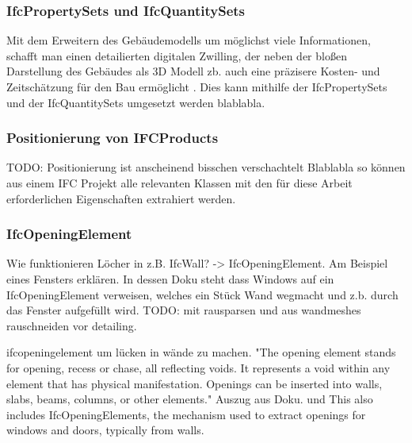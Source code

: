 \subsubsection{IfcPropertySets und IfcQuantitySets}
Mit dem Erweitern des Gebäudemodells um möglichst viele Informationen, schafft man einen detailierten digitalen Zwilling, der neben der bloßen Darstellung des Gebäudes als 3D Modell zb. auch eine präzisere Kosten- und Zeitschätzung für den Bau ermöglicht \cite{Industry93:online}. 
Dies kann mithilfe der IfcPropertySets und der IfcQuantitySets umgesetzt werden blablabla. %

\subsubsection{Positionierung von IFCProducts}
TODO: Positionierung ist anscheinend bisschen verschachtelt
Blablabla so können aus einem IFC Projekt alle relevanten Klassen mit den für diese Arbeit erforderlichen Eigenschaften extrahiert werden.


\subsubsection{IfcOpeningElement}
Wie funktionieren Löcher in z.B. IfcWall? -> IfcOpeningElement.
Am Beispiel eines Fensters erklären. In dessen Doku steht dass Windows auf ein IfcOpeningElement verweisen, welches ein Stück Wand wegmacht und z.b. durch das Fenster aufgefüllt wird.
TODO: mit rausparsen und aus wandmeshes rauschneiden vor detailing.

ifcopeningelement um lücken in wände zu machen.
"The opening element stands for opening, recess or chase, all reflecting voids. It represents a void within any element that has physical manifestation. Openings can be inserted into walls, slabs, beams, columns, or other elements." Auszug aus Doku. und This also includes IfcOpeningElements, the mechanism used to extract openings for windows and doors, typically from walls. %



